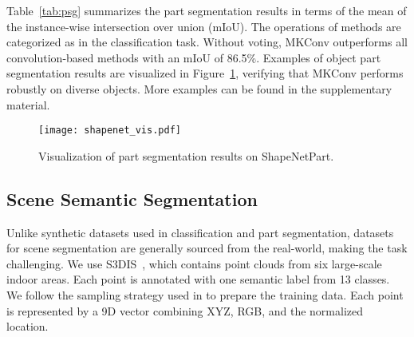 \documentclass[preprint,12pt]{elsarticle}
\begin{document}
Table~\ref{tab:psg} summarizes the part segmentation results in terms of the mean of the instance-wise intersection over union (mIoU). The operations of methods are categorized as in the classification task. Without voting, MKConv outperforms all convolution-based methods with an mIoU of 86.5\%. Examples of object part segmentation results are visualized in Figure~\ref{fig:shapenet}, verifying that MKConv performs robustly on diverse objects. More examples can be found in the supplementary material.

\begin{figure}[t]
	\centering
	\texttt{[image: shapenet\_vis.pdf]}
	\caption{Visualization of part segmentation results on ShapeNetPart.}
	\label{fig:shapenet}
\end{figure} 
\subsection{Scene Semantic Segmentation}
\label{sec:sceneseg}
Unlike synthetic datasets used in classification and part segmentation, datasets for scene segmentation are generally sourced from the real-world, making the task challenging. We use S3DIS~\citep{armeni20163d}, which contains point clouds from six large-scale indoor areas. Each point is annotated with one semantic label from 13 classes. We follow the sampling strategy used in \cite{lin2020fpconv} to prepare the training data. Each point is represented by a 9D vector combining XYZ, RGB, and the normalized location. 
\end{document}
